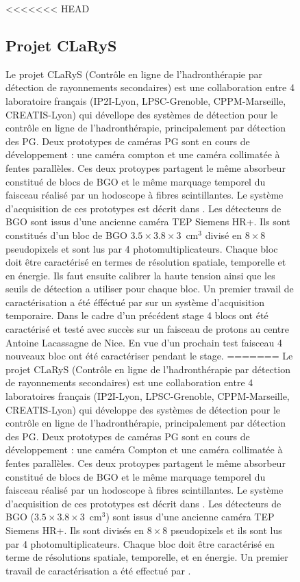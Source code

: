 \documentclass[11pt,a4paper,oldfontcommands]{memoir}
\begin{document}
\begin{figure}
<<<<<<< HEAD


\subsection{Projet CLaRyS}

Le projet CLaRyS (Contrôle en ligne de l’hadronthérapie par détection de rayonnements secondaires) est une collaboration entre 4 laboratoire français (IP2I-Lyon, LPSC-Grenoble, CPPM-Marseille, CREATIS-Lyon) qui dévellope des systèmes de détection pour le contrôle en ligne de l'hadronthérapie, principalement par détection des PG. Deux prototypes de caméras PG sont en cours de développement : une caméra compton et une caméra collimatée à fentes parallèles. Ces deux protoypes partagent le même absorbeur constitué de blocs de BGO et le même marquage temporel du faisceau réalisé par un hodoscope à fibres scintillantes. Le système d'acquisition de ces prototypes est décrit dans \cite{Caplan_2019}. Les détecteurs de BGO sont issus d'une ancienne caméra TEP Siemens HR+. Ils sont constitués d'un bloc de BGO $3.5 \times 3.8 \times 3$~cm$^3$ divisé en $8 \times 8$ pseudopixels et sont lus par 4 photomultiplicateurs. Chaque bloc doit être caractérisé en termes de résolution spatiale, temporelle et en énergie. Ils faut ensuite calibrer la haute tension ainsi que les seuils de détection a utiliser pour chaque bloc. Un premier travail de caractérisation a été éfféctué par \cite{Fontana_2018} sur un système d'acquisition temporaire. Dans le cadre d'un précédent stage  4 blocs ont été caractérisé et testé avec succès sur un faisceau de protons au centre Antoine Lacassagne de Nice. En vue d'un prochain test faisceau 4 nouveaux bloc ont été caractériser pendant le stage. 
=======
Le projet CLaRyS (Contrôle en ligne de l’hadronthérapie par détection de rayonnements secondaires) est une collaboration entre 4 laboratoires français (IP2I-Lyon, LPSC-Grenoble, CPPM-Marseille, CREATIS-Lyon) qui développe des systèmes de détection pour le contrôle en ligne de l'hadronthérapie, principalement par détection des PG. Deux prototypes de caméras PG sont en cours de développement : une caméra Compton et une caméra collimatée à fentes parallèles. Ces deux protoypes partagent le même absorbeur constitué de blocs de BGO et le même marquage temporel du faisceau réalisé par un hodoscope à fibres scintillantes. Le système d'acquisition de ces prototypes est décrit dans \cite{Caplan_2019}. Les détecteurs de BGO ($3.5 \times 3.8 \times 3$~cm$^3$) sont issus d'une ancienne caméra TEP Siemens HR+. Ils sont divisés en $8\times8$ pseudopixels et ils sont lus par 4 photomultiplicateurs. Chaque bloc doit être caractérisé en terme de résolutions spatiale, temporelle, et en énergie. Un premier travail de caractérisation a été effectué par \cite{Fontana_2018}.


\end{figure}
\end{document}
